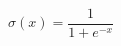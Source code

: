 	\begin{equation} %
	\label{eq:sig}
	\sigma(x) = \frac{1}{1 + e^{-x}} 
	\end{equation} %
	


	
%	
	
